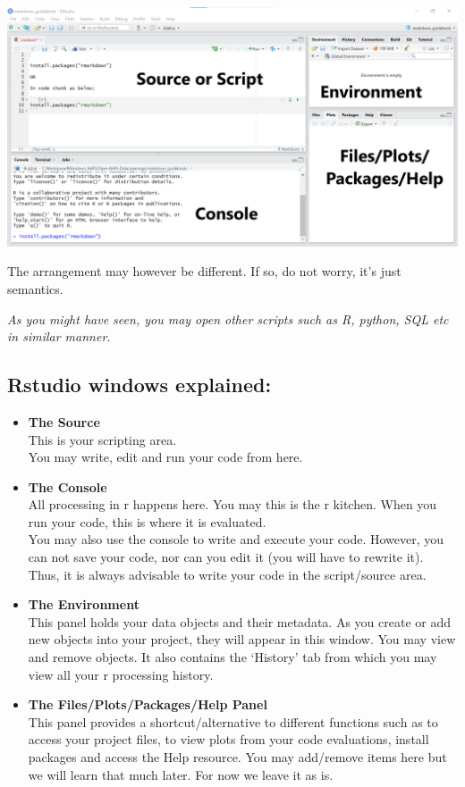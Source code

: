 \documentclass[
]{book}
\begin{document}
\includegraphics{tutorial_screenshots/rstudio_panels_4.png}

The arrangement may however be different. If so, do not worry, it's just semantics.

\emph{As you might have seen, you may open other scripts such as R, python, SQL etc in similar manner.}

\hypertarget{rstudio-windows-explained}{%
\subsection{Rstudio windows explained:}\label{rstudio-windows-explained}}

\begin{itemize}
\item
  \textbf{The Source}\\
  This is your scripting area.\\
  You may write, edit and run your code from here.
\item
  \textbf{The Console}\\
  All processing in r happens here. You may this is the r kitchen.
  When you run your code, this is where it is evaluated.\\
  You may also use the console to write and execute your code. However, you can not save your code, nor can you edit it (you will have to rewrite it). Thus, it is always advisable to write your code in the script/source area.\\
\item
  \textbf{The Environment}\\
  This panel holds your data objects and their metadata. As you create or add new objects into your project, they will appear in this window. You may view and remove objects.
  It also contains the `History' tab from which you may view all your r processing history.\\
\item
  \textbf{The Files/Plots/Packages/Help Panel}\\
  This panel provides a shortcut/alternative to different functions such as to access your project files, to view plots from your code evaluations, install packages and access the Help resource. You may add/remove items here but we will learn that much later. For now we leave it as is.
\end{itemize}
\end{document}
